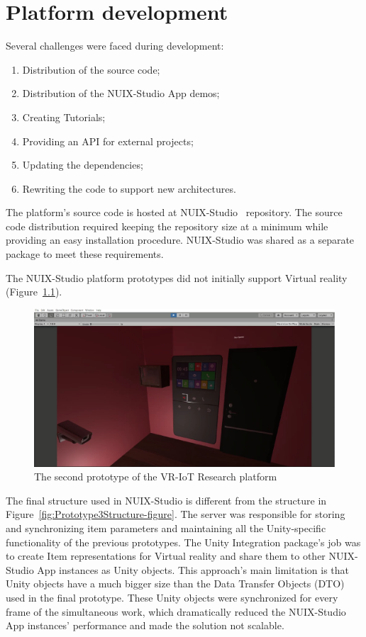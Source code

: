 
\chapter{Platform development}

Several challenges were faced during development:
\begin{enumerate}
    \item Distribution of the source code;
    \item Distribution of the NUIX-Studio App demos;
    \item Creating Tutorials;
    \item Providing an API for external projects;
    \item Updating the dependencies;
    \item Rewriting the code to support new architectures.
\end{enumerate}

The platform's source code is hosted at NUIX-Studio~\cite{NUIXStudio} repository. The source code distribution required keeping the repository size at a minimum while providing an easy installation procedure. NUIX-Studio was shared as a separate package to meet these requirements.

The NUIX-Studio platform prototypes did not initially support Virtual reality (Figure~\ref{fig:Prototype2-figure}).


\begin{figure}
  \centering
  \includegraphics[width=0.9\linewidth]{figures/Prototype2.png}
  \caption{The second prototype of the VR-IoT Research platform}
  \label{fig:Prototype2-figure}
\end{figure}

The final structure used in NUIX-Studio is different from the structure in Figure~\ref{fig:Prototype3Structure-figure}. The server was responsible for storing and synchronizing item parameters and maintaining all the Unity-specific functionality of the previous prototypes. The Unity Integration package's job was to create Item representations for Virtual reality and share them to other NUIX-Studio App instances as Unity objects. This approach's main limitation is that Unity objects have a much bigger size than the Data Transfer Objects (DTO) used in the final prototype. These Unity objects were synchronized for every frame of the simultaneous work, which dramatically reduced the NUIX-Studio App instances' performance and made the solution not scalable.

